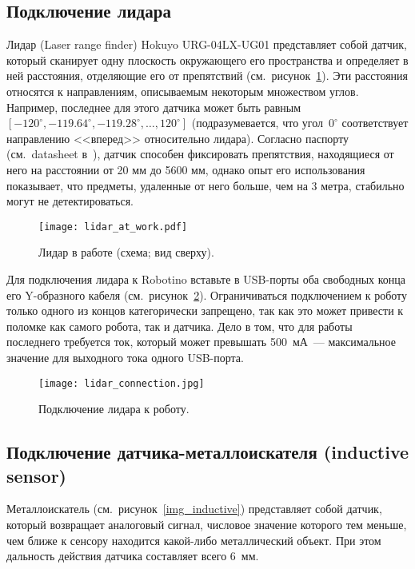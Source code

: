 \subsection{Подключение лидара}
Лидар (Laser range finder) Hokuyo URG-04LX-UG01 представляет собой датчик, который сканирует одну плоскость окружающего его пространства и определяет в ней расстояния, отделяющие его от препятствий (см.~рисунок~\ref{img_lidar_at_work}).
Эти расстояния относятся к направлениям, описываемым некоторым множеством углов.
Например, последнее для этого датчика может быть равным $[-120^\circ, -119.64^\circ, -119.28^\circ, \ldots, 120^\circ]$ (подразумевается, что угол~$0^\circ$ соответствует направлению <<вперед>> относительно лидара).
Согласно паспорту (см.~datasheet в~\cite{lidar}), датчик способен фиксировать препятствия, находящиеся от него на расстоянии от 20 мм до 5600 мм, однако опыт его использования показывает, что предметы, удаленные от него больше, чем на 3 метра, стабильно могут не детектироваться.

\begin{figure}[h!]
	\centering
	\texttt{[image: lidar\_at\_work.pdf]}
	\caption{Лидар в работе (схема; вид сверху).}
	\label{img_lidar_at_work}
\end{figure}

Для подключения лидара к Robotino вставьте в USB-порты оба свободных конца его Y-образного кабеля (см.~рисунок~\ref{img_lidar_connection}).
Ограничиваться подключением к роботу только одного из концов категорически запрещено, так как это может привести к поломке как самого робота, так и датчика.
Дело в том, что для работы последнего требуется ток, который может превышать 500~мА~--- максимальное значение для выходного тока одного USB-порта.

\begin{figure}[h!]
	\centering
	\texttt{[image: lidar\_connection.jpg]}
	\caption{Подключение лидара к роботу.}
	\label{img_lidar_connection}
\end{figure}



\subsection{Подключение датчика-металлоискателя (inductive sensor)}
Металлоискатель (см.~рисунок~\ref{img_inductive}) представляет собой датчик, который возвращает аналоговый сигнал, числовое значение которого тем меньше, чем ближе к сенсору находится какой-либо металлический объект.
При этом дальность действия датчика составляет всего 6~мм.

